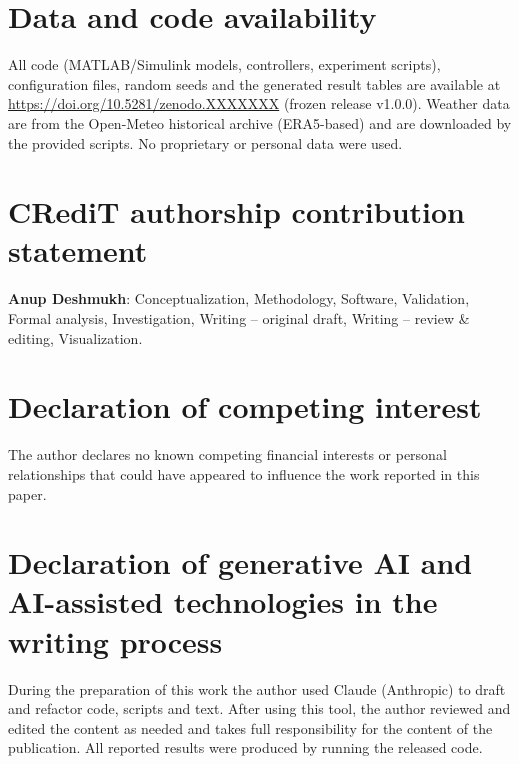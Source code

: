\documentclass[preprint,12pt,authoryear]{elsarticle}
\begin{document}
\section*{Data and code availability}
All code (MATLAB/Simulink models, controllers, experiment scripts), configuration files, random seeds and the generated result tables are available at \url{https://doi.org/10.5281/zenodo.XXXXXXX} (frozen release v1.0.0). Weather data are from the Open-Meteo historical archive (ERA5-based) and are downloaded by the provided scripts. No proprietary or personal data were used.

\section*{CRediT authorship contribution statement}
\textbf{Anup Deshmukh}: Conceptualization, Methodology, Software, Validation, Formal analysis, Investigation, Writing -- original draft, Writing -- review \& editing, Visualization.

\section*{Declaration of competing interest}
The author declares no known competing financial interests or personal relationships that could have appeared to influence the work reported in this paper.

\section*{Declaration of generative AI and AI-assisted technologies in the writing process}
During the preparation of this work the author used Claude (Anthropic) to draft and refactor code, scripts and text. After using this tool, the author reviewed and edited the content as needed and takes full responsibility for the content of the publication. All reported results were produced by running the released code.



\end{document}
